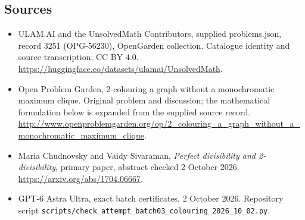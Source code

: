 \documentclass[11pt,a4paper]{article}
\begin{document}
\subsection{Sources}
\begin{itemize}
\item[S1] ULAM.AI and the UnsolvedMath Contributors, supplied problems.json, record 3251 (OPG-56230), OpenGarden collection. Catalogue identity and source transcription; CC BY 4.0.
\url{https://huggingface.co/datasets/ulamai/UnsolvedMath}.
\item[S2] Open Problem Garden, 2-colouring a graph without a monochromatic maximum clique. Original problem and discussion; the mathematical formulation below is expanded from the supplied source record.
\url{http://www.openproblemgarden.org/op/2_colouring_a_graph_without_a_monochromatic_maximum_clique}.

\item[R1] Maria Chudnovsky and Vaidy Sivaraman, \emph{Perfect divisibility
and 2-divisibility}, primary paper, abstract checked 2 October 2026.
\url{https://arxiv.org/abs/1704.06667}.
\item[R2] GPT-6 Astra Ultra, exact batch certificates, 2 October 2026.
Repository script \texttt{scripts/check\_attempt\_batch03\_colouring\_2026\_10\_02.py}.

\end{itemize}
\end{document}
